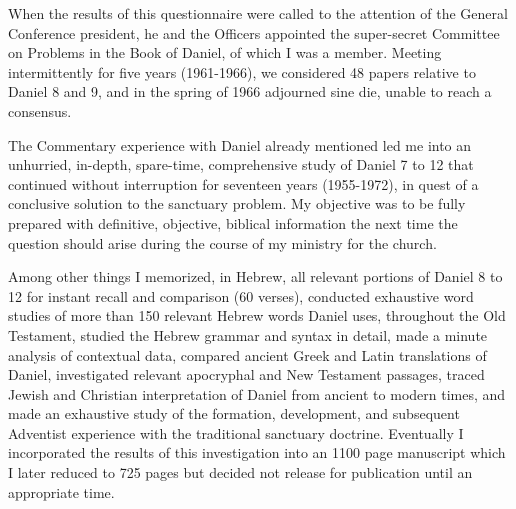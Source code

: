 When the results of this questionnaire were called to the attention of the
General Conference president, he and the Officers appointed the super-secret
Committee on Problems in the Book of Daniel, of which I was a member.
Meeting intermittently for five years (1961-1966), we considered 48 papers
relative to Daniel 8 and 9, and in the spring of 1966 adjourned sine die,
unable to reach a consensus.

The Commentary experience with Daniel already mentioned led me into an
unhurried, in-depth, spare-time, comprehensive study of Daniel 7 to 12
that continued without interruption for seventeen years (1955-1972), in
quest of a conclusive solution to the sanctuary problem. My objective was to
be fully prepared with definitive, objective, biblical information the next
time the question should arise during the course of my ministry for the
church.

Among other things I memorized, in Hebrew, all relevant portions of Daniel 8
to 12 for instant recall and comparison (60 verses), conducted exhaustive
word studies
of more than 150 relevant Hebrew words Daniel uses,
throughout the Old Testament, studied the Hebrew grammar and syntax in
detail, made a minute analysis of contextual data, compared ancient Greek
and Latin translations of Daniel, investigated relevant apocryphal and New
Testament passages, traced Jewish and Christian
interpretation of Daniel
from ancient to modern times,
and made an exhaustive study of the
formation, development, and subsequent Adventist experience with the
traditional sanctuary doctrine.
Eventually I incorporated the results of
this investigation into an 1100 page manuscript which I later reduced to 725
pages but decided not release for publication until an appropriate time.


